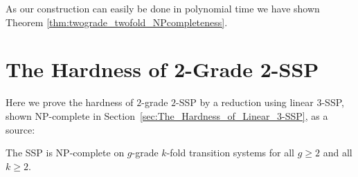 \documentclass[english]{lipics_hacked}
\begin{document}
As our construction can easily be done in polynomial time we have shown Theorem \ref{thm:twograde_twofold_NPcompleteness}. 


\section{The Hardness of 2-Grade 2-SSP}
\label{sec:The_Hardness_of_2-grade_2-SSP}

Here we prove the hardness of $2$-grade $2$-SSP by a reduction using linear $3$-SSP, shown NP-complete in Section~\ref{sec:The_Hardness_of_Linear_3-SSP}, as a source:
%
\begin{theorem}
The SSP is NP-complete on $g$-grade $k$-fold transition systems for all $g \geq 2$ and all $k \geq 2$.
\end{theorem}
%
\end{document}
